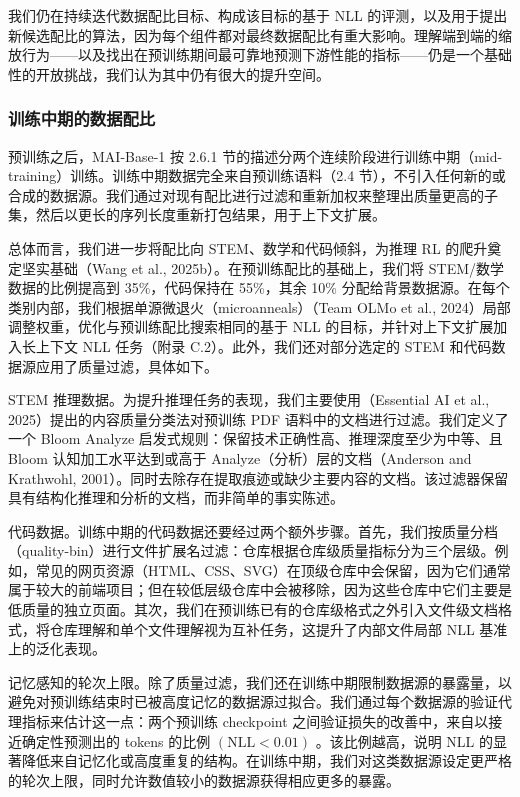 \documentclass[
  10
]{article}
\begin{document}
我们仍在持续迭代数据配比目标、构成该目标的基于 NLL 的评测，以及用于提出新候选配比的算法，因为每个组件都对最终数据配比有重大影响。理解端到端的缩放行为——以及找出在预训练期间最可靠地预测下游性能的指标——仍是一个基础性的开放挑战，我们认为其中仍有很大的提升空间。

\subsubsection{训练中期的数据配比}\label{midtraining-data-mixture}

预训练之后，MAI-Base-1 按 2.6.1 节的描述分两个连续阶段进行训练中期（mid-training）训练。训练中期数据完全来自预训练语料（2.4 节），不引入任何新的或合成的数据源。我们通过对现有配比进行过滤和重新加权来整理出质量更高的子集，然后以更长的序列长度重新打包结果，用于上下文扩展。

总体而言，我们进一步将配比向 STEM、数学和代码倾斜，为推理 RL 的爬升奠定坚实基础（Wang et al., 2025b）。在预训练配比的基础上，我们将 STEM/数学数据的比例提高到 35\%，代码保持在 55\%，其余 10\% 分配给背景数据源。在每个类别内部，我们根据单源微退火（microanneals）（Team OLMo et al., 2024）局部调整权重，优化与预训练配比搜索相同的基于 NLL 的目标，并针对上下文扩展加入长上下文 NLL 任务（附录 C.2）。此外，我们还对部分选定的 STEM 和代码数据源应用了质量过滤，具体如下。

STEM 推理数据。为提升推理任务的表现，我们主要使用（Essential AI et al., 2025）提出的内容质量分类法对预训练 PDF 语料中的文档进行过滤。我们定义了一个 Bloom Analyze 启发式规则：保留技术正确性高、推理深度至少为中等、且 Bloom 认知加工水平达到或高于 Analyze（分析）层的文档（Anderson and Krathwohl, 2001）。同时去除存在提取痕迹或缺少主要内容的文档。该过滤器保留具有结构化推理和分析的文档，而非简单的事实陈述。

代码数据。训练中期的代码数据还要经过两个额外步骤。首先，我们按质量分档（quality-bin）进行文件扩展名过滤：仓库根据仓库级质量指标分为三个层级。例如，常见的网页资源（HTML、CSS、SVG）在顶级仓库中会保留，因为它们通常属于较大的前端项目；但在较低层级仓库中会被移除，因为这些仓库中它们主要是低质量的独立页面。其次，我们在预训练已有的仓库级格式之外引入文件级文档格式，将仓库理解和单个文件理解视为互补任务，这提升了内部文件局部 NLL 基准上的泛化表现。

记忆感知的轮次上限。除了质量过滤，我们还在训练中期限制数据源的暴露量，以避免对预训练结束时已被高度记忆的数据源过拟合。我们通过每个数据源的验证代理指标来估计这一点：两个预训练 checkpoint 之间验证损失的改善中，来自以接近确定性预测出的 tokens 的比例
\(\left( \mathrm { N L L } < 0 . 0 1 \right)\) 。该比例越高，说明 NLL 的显著降低来自记忆化或高度重复的结构。在训练中期，我们对这类数据源设定更严格的轮次上限，同时允许数值较小的数据源获得相应更多的暴露。
\end{document}

